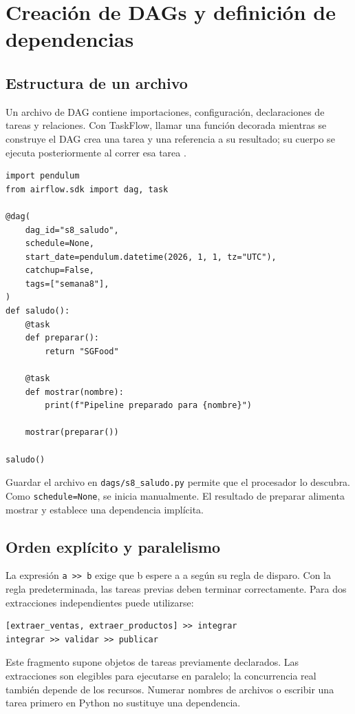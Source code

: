 \documentclass[12pt]{article}
\begin{document}
\section{Creación de DAGs y definición de dependencias}
\subsection{Estructura de un archivo}
Un archivo de DAG contiene importaciones, configuración, declaraciones de tareas y relaciones. Con TaskFlow, llamar una función decorada mientras se construye el DAG crea una tarea y una referencia a su resultado; su cuerpo se ejecuta posteriormente al correr esa tarea \cite{airflow_taskflow}.

\begin{lstlisting}[style=python,caption={DAG mínimo para Airflow 3}]
import pendulum
from airflow.sdk import dag, task

@dag(
    dag_id="s8_saludo",
    schedule=None,
    start_date=pendulum.datetime(2026, 1, 1, tz="UTC"),
    catchup=False,
    tags=["semana8"],
)
def saludo():
    @task
    def preparar():
        return "SGFood"

    @task
    def mostrar(nombre):
        print(f"Pipeline preparado para {nombre}")

    mostrar(preparar())

saludo()
\end{lstlisting}
Guardar el archivo en \texttt{dags/s8\_saludo.py} permite que el procesador lo descubra. Como \texttt{schedule=None}, se inicia manualmente. El resultado de preparar alimenta mostrar y establece una dependencia implícita.

\subsection{Orden explícito y paralelismo}
La expresión \texttt{a \textgreater\textgreater\ b} exige que b espere a a según su regla de disparo. Con la regla predeterminada, las tareas previas deben terminar correctamente. Para dos extracciones independientes puede utilizarse:
\begin{lstlisting}[style=python]
[extraer_ventas, extraer_productos] >> integrar
integrar >> validar >> publicar
\end{lstlisting}
Este fragmento supone objetos de tareas previamente declarados. Las extracciones son elegibles para ejecutarse en paralelo; la concurrencia real también depende de los recursos. Numerar nombres de archivos o escribir una tarea primero en Python no sustituye una dependencia.
\end{document}
